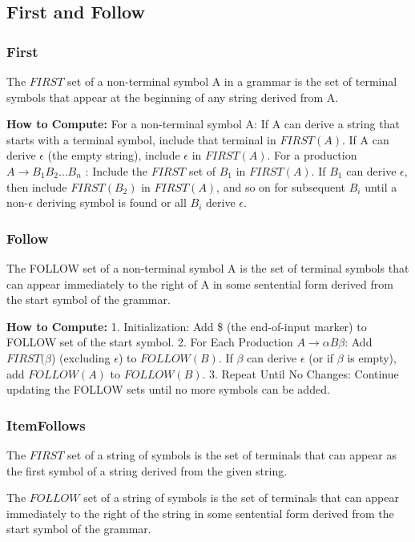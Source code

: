 
\subsection{First and Follow}
\subsubsection{First}
The $FIRST$ set of a non-terminal symbol A in a grammar is the set of terminal symbols that appear at the beginning of any string derived from A.

\textbf{How to Compute:}
For a non-terminal symbol A:
    If A can derive a string that starts with a terminal symbol, include that terminal in $FIRST(A)$.
    If A can derive $\epsilon$ (the empty string), include $\epsilon$ in $FIRST(A)$.
    For a production $A \rightarrow B_1 B_2 \ldots B_n$ :
    Include the $FIRST$ set of $B_1$ in $FIRST(A)$.
    If $B_1$ can derive $\epsilon$, then include $FIRST(B_2)$ in $FIRST(A)$, and so on for subsequent $B_i$ until a non-$\epsilon$ deriving symbol is found or all $B_i$ derive $\epsilon$.

\subsubsection{Follow}
The FOLLOW set of a non-terminal symbol A is the set of terminal symbols that can appear immediately to the right of A in some sentential form derived from the start symbol of the grammar.


\textbf{How to Compute:}
1. Initialization:
   Add \$ (the end-of-input marker) to FOLLOW set of the start symbol.
2. For Each Production $A \rightarrow \alpha B \beta$:
   Add $FIRST(\beta$) (excluding $\epsilon$) to $FOLLOW(B)$.
   If $\beta$ can derive $\epsilon$ (or if $\beta$ is empty), add $FOLLOW(A)$ to $FOLLOW(B)$.
3. Repeat Until No Changes:
   Continue updating the FOLLOW sets until no more symbols can be added.


\subsubsection{ItemFollows}
The $FIRST$ set of a string of symbols is the set of terminals that can appear as the first symbol of a string derived from the given string.

The $FOLLOW$ set of a string of symbols is the set of terminals that can appear immediately to the right of the string in some sentential form derived from the start symbol of the grammar.

